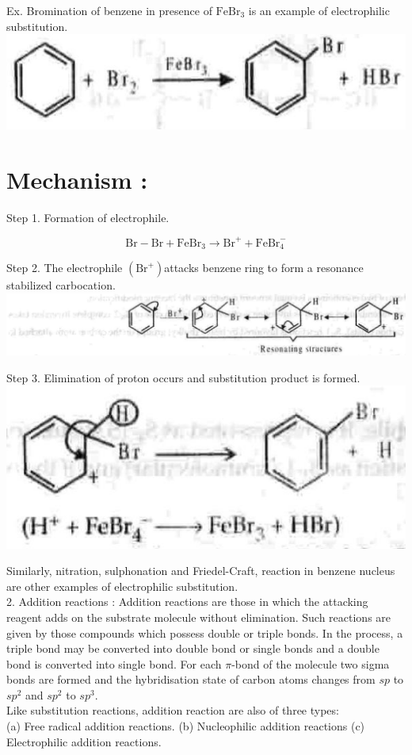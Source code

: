 \documentclass[10pt]{article}
\begin{document}
Ex. Bromination of benzene in presence of $\mathrm{FeBr}_{3}$ is an example of electrophilic substitution.\\
\includegraphics[max width=\textwidth, center]{2025_01_28_8470952b98110cec3aabg-094(1)}

\section*{Mechanism :}
Step 1. Formation of electrophile.

$$
\mathrm{Br}-\mathrm{Br}+\mathrm{FeBr}_{3} \longrightarrow \mathrm{Br}^{+}+\mathrm{FeBr}_{4}^{-}
$$

Step 2. The electrophile $\left(\mathrm{Br}^{+}\right)$attacks benzene ring to form a resonance stabilized carbocation.\\
\includegraphics[max width=\textwidth, center]{2025_01_28_8470952b98110cec3aabg-094(5)}

Step 3. Elimination of proton occurs and substitution product is formed.\\
\includegraphics[max width=\textwidth, center]{2025_01_28_8470952b98110cec3aabg-094}

Similarly, nitration, sulphonation and Friedel-Craft, reaction in benzene nucleus are other examples of electrophilic substitution.\\
2. Addition reactions : Addition reactions are those in which the attacking reagent adds on the substrate molecule without elimination. Such reactions are given by those compounds which possess double or triple bonds. In the process, a triple bond may be converted into double bond or single bonds and a double bond is converted into single bond. For each $\pi$-bond of the molecule two sigma bonds are formed and the hybridisation state of carbon atoms changes from $s p$ to $s p^{2}$ and $s p^{2}$ to $s p^{3}$.\\
Like substitution reactions, addition reaction are also of three types:\\
(a) Free radical addition reactions. (b) Nucleophilic addition reactions (c) Electrophilic addition reactions.
\end{document}
